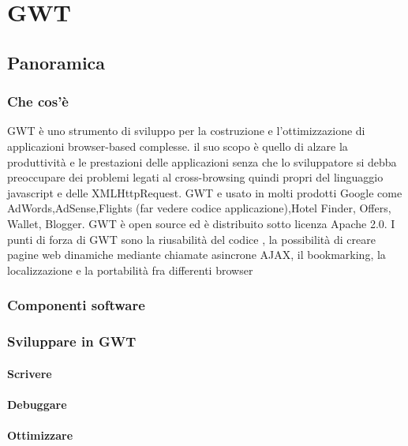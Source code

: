 \chapter[GWT]{GWT\cite{GWT}}
\setcounter{secnumdepth}{5}
\setcounter{tocdepth}{5}

\section{Panoramica}
	  \subsection{Che cos'è}
	
	  
	GWT è uno strumento di sviluppo per la costruzione e l'ottimizzazione di applicazioni browser-based complesse.
	il suo scopo è quello di alzare la produttività e le prestazioni delle applicazioni senza che lo sviluppatore
	si debba preoccupare dei problemi legati al cross-browsing quindi propri del linguaggio javascript e delle XMLHttpRequest.
	GWT e usato in molti prodotti Google come AdWords,AdSense,Flights (far vedere codice applicazione),Hotel Finder, Offers, Wallet, Blogger.
	GWT è open source ed è distribuito sotto licenza Apache 2.0.
	I punti di forza di GWT sono la riusabilità del codice , la possibilità di 
	creare pagine web dinamiche mediante chiamate asincrone AJAX, il bookmarking, la localizzazione e la portabilità fra differenti browser
	  \subsection{Componenti software}
	  \subsection{Sviluppare in GWT}
		\subsubsection{Scrivere}
		
		\subsubsection{Debuggare}

		\subsubsection{Ottimizzare}
		
